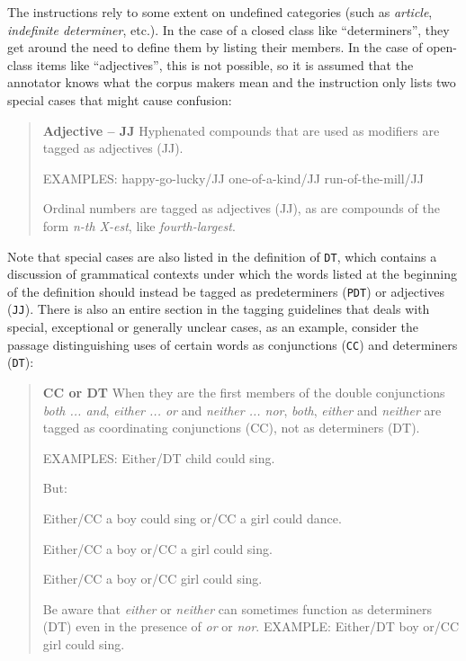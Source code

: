 The instructions rely to some extent on undefined categories  (such as \textit{article},  \textit{indefinite determiner}, etc.). In the case of a closed class like ``determiners'', they get around the need to define them by listing their members. In the case of open\hyp{}class items like ``adjectives'',  this is not possible, so it is assumed that the annotator  knows what the corpus makers mean and the instruction only lists two special cases that might cause confusion:

\begin{quote}
\textbf{Adjective -- JJ}
Hyphenated compounds that are used as modifiers are tagged  as adjectives  (JJ).

EXAMPLES: happy\hyp{}go\hyp{}lucky/JJ one\hyp{}of\hyp{}a\hyp{}kind/JJ
run\hyp{}of\hyp{}the\hyp{}mill/JJ

Ordinal  numbers are tagged  as adjectives  (JJ), as are compounds of the form \textit{n\hyp{}th X\hyp{}est}, like \textit{fourth\hyp{}largest}. \citep[1]{santorini_part--speech_1990}
\end{quote}

Note that special cases are also listed in the definition of \texttt{DT}, which contains a discussion of grammatical contexts under which the words listed at the beginning of the definition should instead be tagged  as predeterminers (\texttt{PDT}) or adjectives  (\texttt{JJ}). There is also an entire section in the tagging guidelines that deals with special, exceptional or generally unclear cases, as an example, consider the passage distinguishing uses of certain words as conjunctions  (\texttt{CC}) and determiners (\texttt{DT}):

\begin{quote}
\textbf{CC or DT}
When they are the first members of the double conjunctions  \textit{both ... and}, \textit{either ... or} and \textit{neither ... nor}, \textit{both}, \textit{either} and \textit{neither} are tagged  as coordinating  conjunctions (CC), not as determiners (DT).

EXAMPLES: Either/DT child could sing.

But:

Either/CC a boy could sing or/CC a girl could dance.

Either/CC a boy or/CC a girl could sing.

Either/CC a boy or/CC girl could sing.

Be aware that \textit{either} or \textit{neither} can sometimes function as determiners (DT) even in the presence of \textit{or} or \textit{nor}.
EXAMPLE: Either/DT boy or/CC girl could sing. \citep[7]{santorini_part--speech_1990}
\end{quote}

